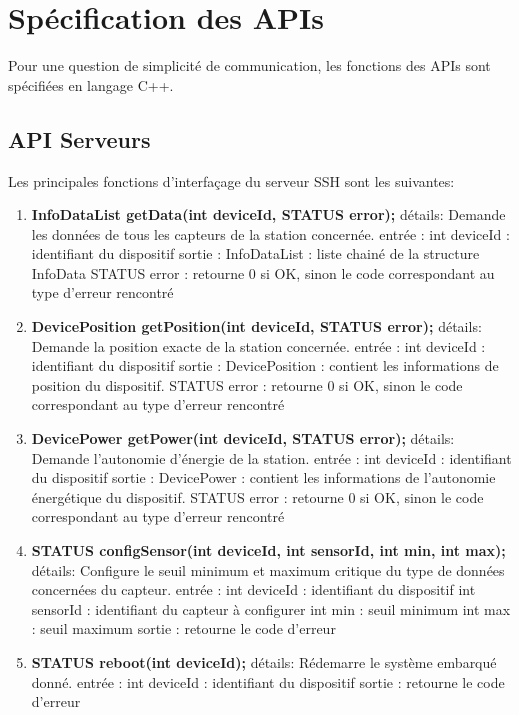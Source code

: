 \section{Spécification des APIs}

Pour une question de simplicité de communication, les fonctions des APIs sont 
spécifiées en langage C++.

\subsection{API Serveurs}
Les principales fonctions d'interfaçage du serveur SSH sont les suivantes:

\begin{enumerate}
\item \textbf{InfoDataList getData(int deviceId, STATUS error);}
détails:
		Demande les données de tous les capteurs de la station concernée.
entrée : 
		int deviceId : identifiant du dispositif
sortie :
		InfoDataList : liste chainé de la structure InfoData
		STATUS error : retourne 0 si OK, sinon le code correspondant au type d'erreur rencontré

\item \textbf{DevicePosition getPosition(int deviceId, STATUS error);}
détails:
		Demande la position exacte de la station concernée.
entrée : 
		int deviceId : identifiant du dispositif
sortie :
		DevicePosition : contient les informations de position du dispositif.
		STATUS error : retourne 0 si OK, sinon le code correspondant au type d'erreur rencontré

\item \textbf{DevicePower getPower(int deviceId, STATUS error);}
détails:
		Demande l’autonomie d'énergie de la station.
entrée : 
		int deviceId : identifiant du dispositif
sortie :
		DevicePower : contient les informations de l’autonomie énergétique du dispositif.
		STATUS error : retourne 0 si OK, sinon le code correspondant au type d'erreur rencontré

\item \textbf{STATUS configSensor(int deviceId, int sensorId, int min, int max);}
détails:
		Configure le seuil minimum et maximum critique du type de données concernées du capteur.
entrée :
		int deviceId : identifiant du dispositif
		int sensorId : identifiant du capteur à configurer
		int min : seuil minimum
		int max : seuil maximum
sortie :
		retourne le code d'erreur

\item \textbf{STATUS reboot(int deviceId);}
détails:
		Rédemarre le système embarqué donné.
entrée :
		int deviceId : identifiant du dispositif
sortie :
		retourne le code d'erreur


\end{enumerate}
